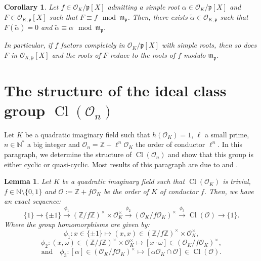 \documentclass[a4paper,10pt]{report}
\theoremstyle{definition}
\theoremstyle{plain}
\newtheorem{Lemma}[Definition]{Lemma}
\newtheorem{Corollary}[Definition]{Corollary}
\theoremstyle{definition}
\newcommand{\N}{\mathbb{N}}
\newcommand{\Z}{\mathbb{Z}}
\newcommand{\mO}{\mathcal{O}}
\renewcommand{\(}{\left(}
\renewcommand{\)}{\right)}
\newcommand{\mf}[1]{\mathfrak{#1}}
\DeclareMathOperator{\Cl}{Cl}
\begin{document}
\begin{Corollary}\label{Corollary 3}
Let $f\in \mO_K/\mf{p}[X]$ admitting a simple root $\alpha\in \mO_K/\mf{p}[X]$ and $F\in \mO_{K,\mf{p}}[X]$ such that $F\equiv f \mod \mf{m}_{\mf{p}}$. Then, there exists $\tilde{\alpha}\in \mO_{K,\mf{p}}$ such that $F(\tilde{\alpha})=0$ and $\tilde{\alpha}\equiv \alpha \mod \mf{m}_{\mf{p}}$. 

In particular, if $f$ factors completely in $\mO_K/\mf{p}[X]$ with simple roots, then so does $F$ in $\mO_{K,\mf{p}}[X]$ and the roots of $F$ reduce to the roots of $f$ modulo $\mf{m}_{\mf{p}}$.
\end{Corollary}

\section{The structure of the ideal class group $\Cl(\mO_n)$}\label{appendix 1}

Let $K$ be a quadratic imaginary field such that $h(\mO_K)=1$, $\ell$ a small prime, $n\in\N^*$ a big integer and $\mO_n=\Z+\ell^n\mO_K$ the order of conductor $\ell^n$.  In this paragraph, we determine the structure of $\Cl(\mO_n)$ and show that this group is either cyclic or quasi-cyclic. Most results of this paragraph are due to \cite[chapter 7]{Cox} and \cite[chapter 4]{Cohen2}.

\begin{Lemma}
Let $K$ be a quadratic imaginary field such that $\Cl(\mO_K)$ is trivial, $f\in\N\setminus\{0,1\}$ and $\mO:=\Z+f\mO_K$ be the order of $K$ of conductor $f$. Then, we have an exact sequence:
\[\{1\}\longrightarrow\{\pm 1\}\overset{\phi_1}{\longrightarrow} (\Z/f\Z)^\times\times \mO_K^\times\overset{\phi_2}{\longrightarrow} (\mO_K/f\mO_K)^\times\overset{\phi_3}{\longrightarrow} \Cl(\mO)\longrightarrow\{1\}.\]
Where the group homomorphisms are given by:
\[\phi_1:x\in\{\pm 1\}\longmapsto (x,x)\in (\Z/f\Z)^\times\times \mO_K^\times,\]
\[\phi_2:(\overline{x},\omega)\in (\Z/f\Z)^\times\times \mO_K^\times\longmapsto [x\cdot \omega]\in(\mO_K/f\mO_K)^\times,\]
\[\mbox{and} \quad \phi_3:[\alpha]\in(\mO_K/f\mO_K)^\times\longmapsto [\alpha\mO_K\cap\mO]\in \Cl(\mO).\]
\end{Lemma}
\end{document}
